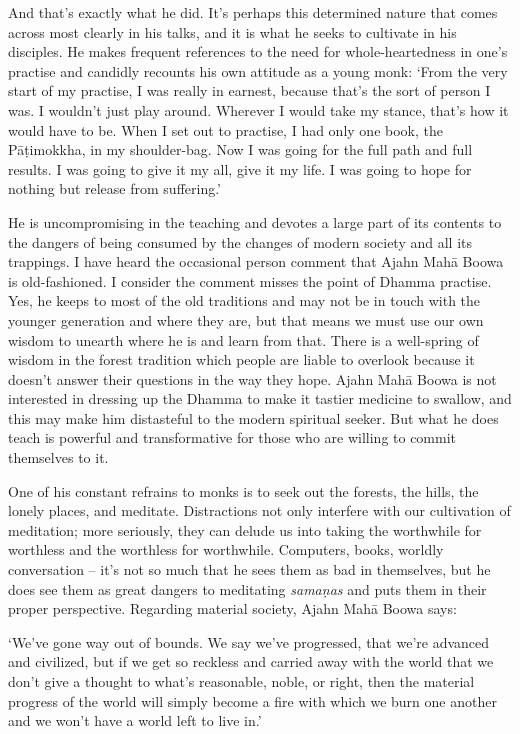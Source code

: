 And that's exactly what he did. It's perhaps this determined nature that
comes across most clearly in his talks, and it is what he seeks to
cultivate in his disciples. He makes frequent references to the need for
whole-heartedness in one's practise and candidly recounts his own
attitude as a young monk: `From the very start of my practise, I was
really in earnest, because that's the sort of person I was. I wouldn't
just play around. Wherever I would take my stance, that's how it would
have to be. When I set out to practise, I had only one book, the
Pāṭimokkha, in my shoulder-bag. Now I was going for the full path and
full results. I was going to give it my all, give it my life. I was
going to hope for nothing but release from suffering.'

He is uncompromising in the teaching and devotes a large part of its
contents to the dangers of being consumed by the changes of modern
society and all its trappings. I have heard the occasional person
comment that Ajahn Mahā Boowa is old-fashioned. I consider the comment
misses the point of Dhamma practise. Yes, he keeps to most of the old
traditions and may not be in touch with the younger generation and where
they are, but that means we must use our own wisdom to unearth where he
is and learn from that. There is a well-spring of wisdom in the forest
tradition which people are liable to overlook because it doesn't answer
their questions in the way they hope. Ajahn Mahā Boowa is not interested
in dressing up the Dhamma to make it tastier medicine to swallow, and
this may make him distasteful to the modern spiritual seeker. But what
he does teach is powerful and transformative for those who are willing
to commit themselves to it. 

One of his constant refrains to monks is to seek out the forests, the
hills, the lonely places, and meditate. Distractions not only interfere
with our cultivation of meditation; more seriously, they can delude us
into taking the worthwhile for worthless and the worthless for
worthwhile. Computers, books, worldly conversation -- it's not so much
that he sees them as bad in themselves, but he does see them as great
dangers to meditating \emph{samaṇas} and puts them in their proper
perspective. Regarding material society, Ajahn Mahā Boowa says: 

`We've gone way out of bounds. We say we've progressed, that we're
advanced and civilized, but if we get so reckless and carried away with
the world that we don't give a thought to what's reasonable, noble, or
right, then the material progress of the world will simply become a fire
with which we burn one another and we won't have a world left to live
in.'

